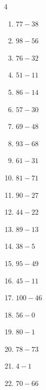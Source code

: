\begin{multicols}{4}
\begin{enumerate}
  \item $77-38$
        \phantom{$=39$}

  \item $98-56$
        \phantom{$=42$}

  \item $76-32$
        \phantom{$=44$}

  \item $51-11$
        \phantom{$=40$}

  \item $86-14$
        \phantom{$=72$}

  \item $57-30$
        \phantom{$=27$}

  \item $69-48$
        \phantom{$=21$}

  \item $93-68$
        \phantom{$=25$}

  \item $61-31$
        \phantom{$=30$}

  \item $81-71$
        \phantom{$=10$}

  \item $90-27$
        \phantom{$=63$}

  \item $44-22$
        \phantom{$=22$}

  \item $89-13$
        \phantom{$=76$}

  \item $38-5$
        \phantom{$=33$}

  \item $95-49$
        \phantom{$=46$}

  \item $45-11$
        \phantom{$=34$}

\columnbreak %

  \item $100-46$
        \phantom{$=54$}

  \item $56-0$
        \phantom{$=56$}

  \item $80-1$
        \phantom{$=79$}

  \item $78-73$
        \phantom{$=5$}

  \item $4-1$
        \phantom{$=3$}

  \item $70-66$
        \phantom{$=4$}


\end{enumerate}
\end{multicols}
